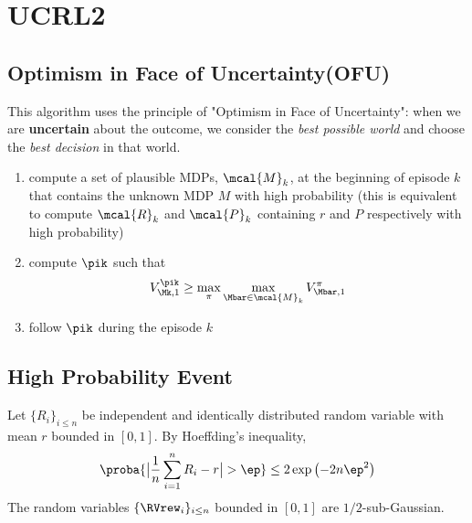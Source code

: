     \section{UCRL2}
    \label{sec:ucrl2}
    
        \subsection{Optimism in Face of Uncertainty(OFU)}
        \label{subsec:OFU}
        
            This algorithm uses the principle of "Optimism in Face of Uncertainty": when we are \textbf{uncertain} about the outcome, we consider the \textit{best possible world} and choose the \textit{best decision} in that world.
            
            \begin{enumerate}
                \item compute a set of plausible MDPs, $\mcal{M}_k$, at the beginning of episode $k$ that contains the unknown MDP $M$ with high probability (this is equivalent to compute $\mcal{R}_k$ and $\mcal{P}_k$ containing $r$ and $P$ respectively with high probability)
                \item compute $\pik$ such that
                    \begin{align}
                    V_{\Mk,1}^{\pik} \ge \max_{\pi}\max_{\Mbar\in\mcal{M}_k} V_{\Mbar,1}^\pi
                    \end{align}
                \item follow $\pik$ during the episode $k$
            \end{enumerate}
        
        \subsection{High Probability Event}
        \label{subsec:high_prob_event}
        
            \begin{thm}
            \label{thm:hoeffding}
                Let $\{R_i\}_{i\le n}$ be independent and identically distributed random variable with mean $r$ bounded in $[0,1]$.
                By Hoeffding's inequality,
                \begin{align*}
                    \proba{\big\vert\frac{1}{n}\sum_{i=1}^nR_i-r\big\vert>\ep}\le2\exp\left(-2n\ep^2\right)
                \end{align*}
                The random variables $\{\RVrew_i\}_{i\le n}$ bounded in $[0,1]$ are $1/2$-sub-Gaussian.
            \end{thm}
            
